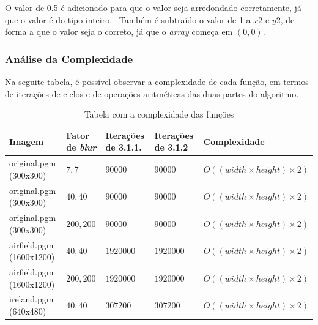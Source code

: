     \par O valor de 0.5 é adicionado para que o valor seja arredondado corretamente, já que o valor é do tipo inteiro. \ Também é subtraído o valor de 1 a $x2$ e $y2$, de forma a que o valor seja o correto, já que o \textit{array} começa em $(0,0)$.

\subsubsection{Análise da Complexidade}
    \par Na seguite tabela, é possível observar a complexidade de cada função, em termos de iterações de ciclos e de operações aritméticas das duas partes do algoritmo.

    \begin{table}[H]
        \centering
        \begin{tabular}{| p{23mm} | p{25mm} | p{30mm} | p{30mm} | p{38mm} |}
            \hline

            \textbf{Imagem} & \textbf{Fator de \textit{blur}} & \textbf{Iterações de 3.1.1.} & \textbf{Iterações de 3.1.2} & \textbf{Complexidade} \\ \hline

            original.pgm (300x300) & $7,7$ & $90000$ & $90000$ & $O((width \times height) \times 2)$ \\ \hline

            original.pgm (300x300) & $40,40$ & $90000$ & $90000$ & $O((width \times height) \times 2)$ \\ \hline

            original.pgm (300x300) & $200,200$ & $90000$ & $90000$ & $O((width \times height) \times 2)$ \\ \hline

            airfield.pgm (1600x1200) & $40,40$ & $1920000$ & $1920000$ & $O((width \times height) \times 2)$ \\ \hline

            airfield.pgm (1600x1200) & $200,200$ & $1920000$ & $1920000$ & $O((width \times height) \times 2)$ \\ \hline

            ireland.pgm (640x480) & $40,40$ & $307200$ & $307200$ & $O((width \times height) \times 2)$ \\ \hline
        \end{tabular}
        \caption{Tabela com a complexidade das funções}
        \label{tab:complexidade}
    \end{table}


